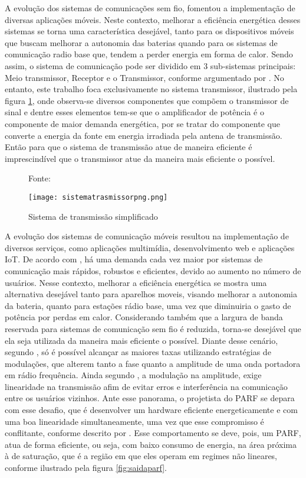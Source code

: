 A evolução dos sistemas de comunicações sem fio, fomentou a implementação de diversas aplicações móveis. Neste contexto, melhorar a eficiência energética desses sistemas se torna uma característica desejável, tanto para os dispositivos móveis que buscam melhorar a autonomia das baterias quando para os sistemas de comunicação radio base que, tendem a perder energia em forma de calor.  
Sendo assim, o sistema de comunicação pode ser dividido em 3 sub-sistemas principais: Meio transmissor, Receptor e o Transmissor, conforme argumentado por \cite{Schuartz2017}.
No entanto, este trabalho foca exclusivamente no sistema transmissor, ilustrado pela figura \ref{fig:sistemadetrasmissao}, onde observa-se diversos componentes que compõem o transmissor de sinal e dentre esses elementos tem-se que o amplificador de potência é o componente de maior demanda energética, por se tratar do componente que converte a energia da fonte em energia irradiada pela antena de transmissão. Então para que o sistema de transmissão atue de maneira eficiente é imprescindível que o transmissor atue da maneira mais eficiente o possível.

\begin{figure}[ht!]
    \centering
    \captionsetup{justification=centering}
    \caption*{Fonte: \cite{Schuartz2017}}
    \texttt{[image: sistematrasmissorpng.png]}
    \caption{Sistema de transmissão simpliﬁcado}
    \label{fig:sistemadetrasmissao}
\end{figure}

A evolução dos sistemas de comunicação móveis resultou na implementação de diversos serviços, como aplicações multimídia, desenvolvimento web e aplicações IoT. De acordo com \cite{John2016}, há uma demanda cada vez maior por sistemas de comunicação mais rápidos, robustos e eficientes, devido ao aumento no número de usuários.  Nesse contexto, melhorar a eficiência energética se mostra uma alternativa desejável tanto para aparelhos moveis, visando melhorar a autonomia da bateria, quanto para estações rádio base, uma vez que diminuiria o gasto de potência por perdas em calor. Considerando também que a largura de banda reservada para sistemas de comunicação sem fio é reduzida, torna-se desejável que ela seja utilizada da maneira mais eficiente o possível. Diante desse cenário, segundo \cite{Kenington2000}, só é possível alcançar as maiores taxas utilizando estratégias de modulações, que alterem tanto a fase quanto a amplitude de uma onda portadora em rádio frequência. Ainda segundo \cite{Kenington2000}, a modulação na amplitude, exige linearidade na transmissão afim de evitar erros e interferência na comunicação entre os usuários vizinhos. Ante esse panorama, o projetista do PARF se depara com esse desafio, que é desenvolver um hardware eficiente energeticamente e com uma boa linearidade simultaneamente, uma vez que esse compromisso é conflitante, conforme descrito por \cite{Cripps2006}. Esse comportamento se deve, pois, um PARF, atua de forma eficiente, ou seja, com baixo consumo de energia, na área próxima à de saturação, que é a região em que eles operam em regimes não lineares, conforme ilustrado pela figura \ref{fig:saidaparf}.




